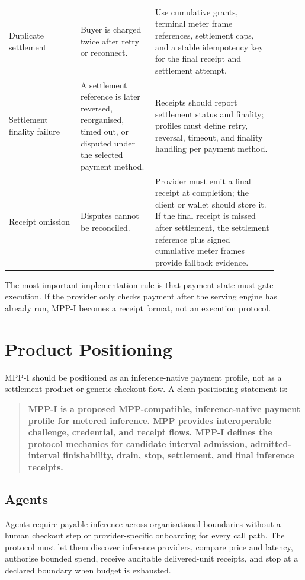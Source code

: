 \documentclass[11pt]{article}
\newcommand{\mppi}{MPP-I}
\begin{document}
\begin{longtable}{>{\raggedright\arraybackslash}p{0.24\linewidth} >{\raggedright\arraybackslash}p{0.25\linewidth} >{\raggedright\arraybackslash}p{0.41\linewidth}}
Duplicate settlement & Buyer is charged twice after retry or reconnect. & Use cumulative grants, terminal meter frame references, settlement caps, and a stable idempotency key for the final receipt and settlement attempt. \\
Settlement finality failure & A settlement reference is later reversed, reorganised, timed out, or disputed under the selected payment method. & Receipts should report settlement status and finality; profiles must define retry, reversal, timeout, and finality handling per payment method. \\
Receipt omission & Disputes cannot be reconciled. & Provider must emit a final receipt at completion; the client or wallet should store it. If the final receipt is missed after settlement, the settlement reference plus signed cumulative meter frames provide fallback evidence. \\
\bottomrule
\end{longtable}

The most important implementation rule is that payment state must gate execution. If the provider only checks payment after the serving engine has already run, \mppi{} becomes a receipt format, not an execution protocol.

\section{Product Positioning}

\mppi{} should be positioned as an inference-native payment profile, not as a settlement product or generic checkout flow. A clean positioning statement is:

\begin{quote}
\textbf{\mppi{} is a proposed MPP-compatible, inference-native payment profile for metered inference. MPP provides interoperable challenge, credential, and receipt flows. \mppi{} defines the protocol mechanics for candidate interval admission, admitted-interval finishability, drain, stop, settlement, and final inference receipts.}
\end{quote}

\subsection{Agents}

Agents require payable inference across organisational boundaries without a human checkout step or provider-specific onboarding for every call path. The protocol must let them discover inference providers, compare price and latency, authorise bounded spend, receive auditable delivered-unit receipts, and stop at a declared boundary when budget is exhausted.
\end{document}
